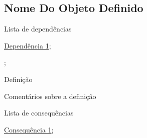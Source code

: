 \subsection{Nome Do Objeto Definido}
\label{nome-do-objeto-def}
\begin{titlemize}{Lista de dependências}
	\item \hyperref[dependecia1]{Dependência 1};\\ %
	\item \hyperref[]{};\\
\end{titlemize}
\begin{defi}
	Definição 
\end{defi}

Comentários sobre a definição

\begin{titlemize}{Lista de consequências}
	\item \hyperref[consequencia1]{Consequência 1};\\ %
	\item \hyperref[]{}
\end{titlemize}

